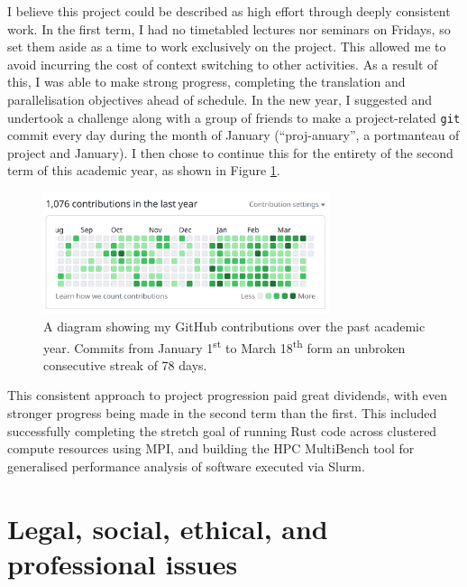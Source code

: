 I believe this project could be described as high effort through deeply consistent work. In the first term, I had no timetabled lectures nor seminars on Fridays, so set them aside as a time to work exclusively on the project. This allowed me to avoid incurring the cost of context switching to other activities. As a result of this, I was able to make strong progress, completing the translation and parallelisation objectives ahead of schedule. In the new year, I suggested and undertook a challenge along with a group of friends to make a project-related \texttt{git} commit every day during the month of January (``proj-anuary'', a portmanteau of project and January). I then chose to continue this for the entirety of the second term of this academic year, as shown in Figure \ref{fig:github_year_long_contributions}.

\begin{figure}[h]
    \centering
    \includegraphics[width=0.75\textwidth]{images/6_project_management/github_year_long_contributions.png}
    \caption{A diagram showing my GitHub contributions over the past academic year. Commits from January 1\textsuperscript{st} to March 18\textsuperscript{th} form an unbroken consecutive streak of 78 days.}
    \label{fig:github_year_long_contributions}
\end{figure}

This consistent approach to project progression paid great dividends, with even stronger progress being made in the second term than the first. This included successfully completing the stretch goal of running Rust code across clustered compute resources using MPI, and building the HPC MultiBench tool for generalised performance analysis of software executed via Slurm.

\section{Legal, social, ethical, and professional issues}
\label{sec:legal-social-ethical-professional-issues}

